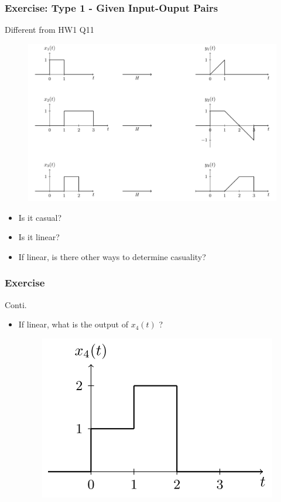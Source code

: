 \documentclass{beamer}
\begin{document}
\begin{frame}
    \frametitle{Exercise: Type 1 - Given Input-Ouput Pairs}
    \begin{block}{ Different from HW1 Q11}
    \begin{figure}
    \includegraphics[width=0.6\linewidth]{hw1_q11}
    \end{figure}
    \end{block}
    \begin{itemize}
        \item Is it casual?
        \item Is it linear?
        \item If linear, is there other ways to determine casuality?    
    \end{itemize}
    
    \end{frame}
    
    \begin{frame}[t]
    \frametitle{Exercise}
    \begin{block}{Conti.}
    \begin{itemize}
    \item If linear, what is the output of $x_4(t)$ ?
    \begin{figure}
    \includegraphics[width=0.4\linewidth]{exercise3}
    \end{figure}
    \end{itemize}
    \end{block}
\end{frame}
\end{document}
